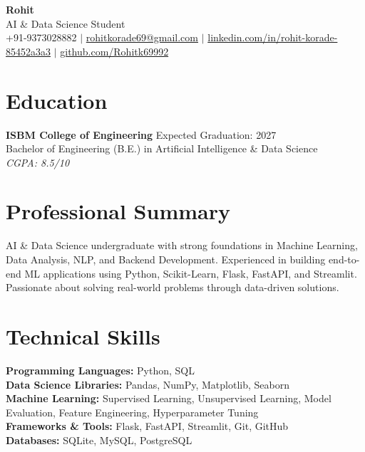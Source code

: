 \documentclass[letterpaper,10pt]{article}
\begin{document}
\begin{center}
    {\Huge \textbf{Rohit}} \\ \vspace{2pt}
    {\large AI \& Data Science Student} \\ \vspace{4pt}
    \small +91-9373028882 $|$ \href{mailto:rohitkorade69@gmail.com}{rohitkorade69@gmail.com} $|$ \href{https://www.linkedin.com/in/rohit-korade-85452a3a3}{linkedin.com/in/rohit-korade-85452a3a3} $|$ \href{https://github.com/Rohitk69992}{github.com/Rohitk69992}
\end{center}

\section{Education}
  \vspace{4pt}
  \textbf{ISBM College of Engineering} \hfill Expected Graduation: 2027 \\
  Bachelor of Engineering (B.E.) in Artificial Intelligence \& Data Science \\
  \textit{CGPA: 8.5/10} \\

\section{Professional Summary}
  \vspace{4pt}
  AI \& Data Science undergraduate with strong foundations in Machine Learning, Data Analysis, NLP, and Backend Development. Experienced in building end-to-end ML applications using Python, Scikit-Learn, Flask, FastAPI, and Streamlit. Passionate about solving real-world problems through data-driven solutions.

\section{Technical Skills}
  \vspace{4pt}
  \textbf{Programming Languages:} Python, SQL \\
  \textbf{Data Science Libraries:} Pandas, NumPy, Matplotlib, Seaborn \\
  \textbf{Machine Learning:} Supervised Learning, Unsupervised Learning, Model Evaluation, Feature Engineering, Hyperparameter Tuning \\
  \textbf{Frameworks \& Tools:} Flask, FastAPI, Streamlit, Git, GitHub \\
  \textbf{Databases:} SQLite, MySQL, PostgreSQL \\
\end{document}
